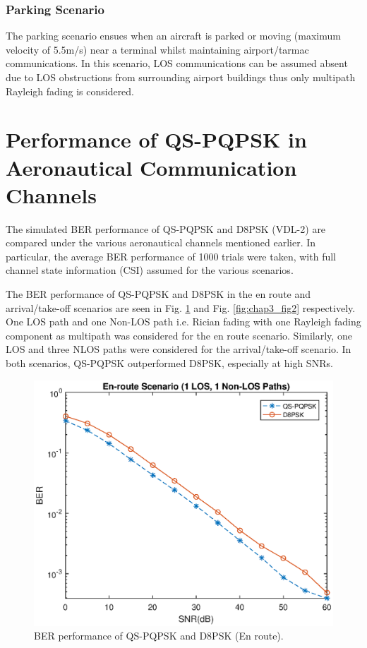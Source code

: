 
\subsubsection{Parking Scenario}
The parking scenario ensues when an aircraft is parked or moving (maximum velocity of 5.5m/s) near a terminal whilst maintaining airport/tarmac communications. In this scenario, LOS communications can be assumed absent due to LOS obstructions from surrounding airport buildings thus only multipath Rayleigh fading is considered.

\section{Performance of QS-PQPSK in Aeronautical Communication Channels}

The simulated BER performance of QS-PQPSK and D8PSK (VDL-2) are compared under the various aeronautical channels mentioned earlier. In particular, the average BER performance of 1000 trials were taken, with full channel state information (CSI) assumed for the various scenarios. 

The BER performance of QS-PQPSK and D8PSK in the en route and arrival/take-off scenarios are seen in Fig. \ref{fig:chap3_fig1} and Fig. \ref{fig:chap3_fig2} respectively. One LOS path and one Non-LOS path i.e. Rician fading with one Rayleigh fading component as multipath was considered for the en route scenario. Similarly, one LOS and three NLOS paths were considered for the arrival/take-off scenario. In both scenarios, QS-PQPSK outperformed D8PSK, especially at high SNRs.

\begin{figure} []
\centering
\includegraphics [width=0.5\columnwidth]{chap3_fig/chap3_fig1.eps} 
\caption{BER performance of QS-PQPSK and D8PSK (En route).}
\label{fig:chap3_fig1}
\end{figure}

